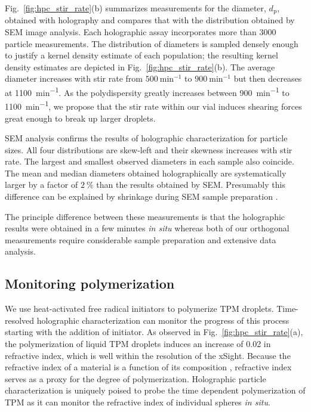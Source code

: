 Fig.~\ref{fig:hpc_stir_rate}(b) summarizes measurements for the diameter, $d_{\text{p}}$,
obtained with holography and compares that with the distribution obtained
by SEM image analysis.
Each holographic assay incorporates more than \num{3000} particle measurements.
The distribution of diameters is sampled densely enough to justify a kernel density
estimate of each population; the resulting kernel density estimates
are depicted in Fig.~\ref{fig:hpc_stir_rate}(b).
The average diameter increases with stir
rate from $\SI{500}{\minute^{-1}}$ to $\SI{900}{\minute^{-1}}$ but then decreases
at \SI{1100}{\minute^{-1}}. As the polydispersity greatly increases between
\SI{900}{\minute^{-1}} to \SI{1100}{\minute^{-1}}, we propose that the stir rate within
our vial induces shearing forces great enough to break up larger droplets.

SEM analysis confirms the results of holographic characterization for
particle sizes. All four distributions are
skew-left and their skewness increases with stir rate. The largest and smallest
observed diameters in each sample also coincide. The mean and median diameters
obtained holographically are systematically larger by a factor of $\SI{2}{\percent}$
than the results obtained by SEM. Presumably this difference can be explained
by shrinkage during SEM sample preparation \cite{yamada85,jung02}.

The principle difference between these measurements is that the holographic
results were obtained in a few minutes \emph{in situ} whereas both of
our orthogonal measurements require considerable sample preparation and
extensive data analysis.


\subsection{Monitoring polymerization}

We use heat-activated free radical initiators to polymerize TPM droplets.
Time-resolved holographic characterization can monitor the progress of
this process starting with the addition of initiator.
As observed in Fig.~\ref{fig:hpc_stir_rate}(a), the polymerization of
liquid TPM droplets induces an increase of \SI{0.02}{} in refractive index,
which is well within the resolution of the xSight.  Because the refractive index
of a material is a function of its composition \cite{wang15},
refractive index serves as a proxy for the degree of polymerization.
Holographic particle characterization is uniquely poised to probe the time dependent
polymerization of TPM as it can monitor the refractive index of individual spheres
\emph{in situ}.

